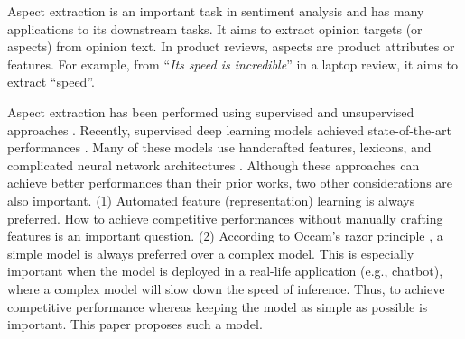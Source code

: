 Aspect extraction is an important task in sentiment analysis \cite{HuL2004} and has many applications to its downstream tasks\cite{Liu2012}.
It aims to extract opinion targets (or aspects) from opinion text. 
In product reviews, aspects are product attributes or features. 
For example, from ``\textit{Its speed is incredible}'' in a laptop review, it aims to extract ``speed''. 

Aspect extraction has been performed using supervised \cite{Jakob2010,chernyshevich2014ihs,shu2017lifelong} and unsupervised approaches \cite{HuL2004,ZhuangJZ2006,MeiLWSZ2007,QiuLBC2011,yin2016unsupervised,he2017unsupervised}. 
Recently, supervised deep learning models achieved state-of-the-art performances \cite{li2017deep}. Many of these models use handcrafted features, lexicons, and complicated neural network architectures \cite{poria2016aspect,wang2016recursive,wang2017coupled,li2017deep}. 
Although these approaches can achieve better performances than their prior works, two other considerations are also important.
(1) Automated feature (representation) learning is always preferred. 
How to achieve competitive performances without manually crafting features is an important question. 
(2) According to Occam's razor principle \cite{blumer1987occam}, a simple model is always preferred over a complex model.
This is especially important when the model is deployed in a real-life application (e.g., chatbot), where a complex model will slow down the speed of inference. Thus, to achieve competitive performance whereas keeping the model as simple as possible is important. This paper proposes such a model. 

